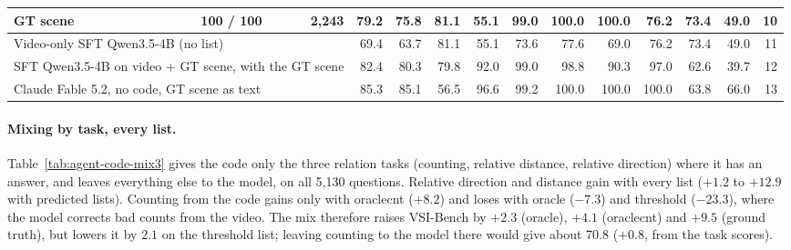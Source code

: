 \begin{table}[h]
{\begin{tabular}{lrrrrrrrrrrrrr}
GT scene & 100 / 100 & 2,243 & 79.2 & 75.8 & 81.1 & 55.1 & 99.0 & 100.0 & 100.0 & 76.2 & 73.4 & 49.0 & 10 \\
\midrule
\multicolumn{3}{l}{Video-only SFT Qwen3.5-4B (no list)} & 69.4 & 63.7 & 81.1 & 55.1 & 73.6 & 77.6 & 69.0 & 76.2 & 73.4 & 49.0 & 11 \\
\multicolumn{3}{l}{SFT Qwen3.5-4B on video + GT scene, with the GT scene} & 82.4 & 80.3 & 79.8 & 92.0 & 99.0 & 98.8 & 90.3 & 97.0 & 62.6 & 39.7 & 12 \\
\multicolumn{3}{l}{Claude Fable 5.2, no code, GT scene as text} & 85.3 & 85.1 & 56.5 & 96.6 & 99.2 & 100.0 & 100.0 & 100.0 & 63.8 & 66.0 & 13 \\
\bottomrule
\end{tabular}}
\end{table}

\paragraph{Mixing by task, every list.}
Table~\ref{tab:agent-code-mix3} gives the code only the three relation tasks (counting, relative distance, relative
direction) where it has an answer, and leaves everything else to the model, on all 5,130 questions. Relative direction
and distance gain with every list ($+1.2$ to $+12.9$ with predicted lists). Counting from the code gains only with
oraclecnt ($+8.2$) and loses with oracle ($-7.3$) and threshold ($-23.3$), where the model corrects bad counts from the
video. The mix therefore raises VSI-Bench by $+2.3$ (oracle), $+4.1$ (oraclecnt) and $+9.5$ (ground truth), but lowers it
by $2.1$ on the threshold list; leaving counting to the model there would give about 70.8 ($+0.8$, from the task scores).

